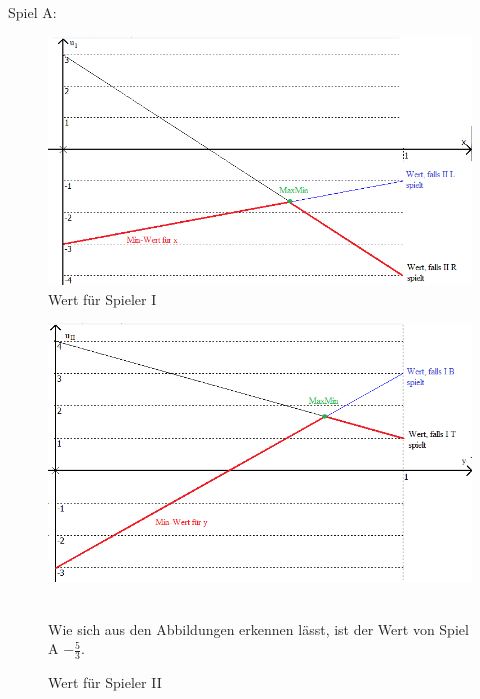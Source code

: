 \documentclass{scrartcl}
\begin{document}
Spiel A: \\
\begin{figure}[h!]
\includegraphics[width=1\textwidth]{2_maxMin_A1.png}
\caption{Wert für Spieler I}
\end{figure}
\begin{figure}
\includegraphics[width=1\textwidth]{2_maxMin_A2.png}
\caption{Wert für Spieler II}
\text{ }\\
Wie sich aus den Abbildungen erkennen lässt, ist der Wert von Spiel A $-\frac{5}{3}$.
\end{figure}
\text{ }\\
\end{document}
